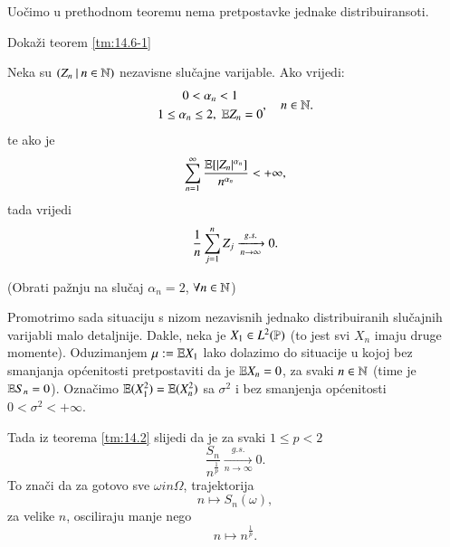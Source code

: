 Uo\v cimo u prethodnom teoremu nema pretpostavke jednake distribuiransoti.

\begin{zad} \label{zad:14.7}
    Doka\v zi teorem \ref{tm:14.6-1}
\end{zad}

\begin{zad} \label{zad:14.8}
    Neka su $({Z_n} \: | \: {n \in \mathbb{N}})$ nezavisne slu\v cajne varijable.
    Ako vrijedi:
    \begin{equation*}
        \begin{gathered}
            \begin{gathered}
                0 < \alpha_n < 1\\
                1 \leq \alpha_n \leq 2, \; \mathbb{E} Z_n = 0
            \end{gathered},
            \quad n \in \mathbb{N}.
        \end{gathered}
    \end{equation*}
    te ako je
    \begin{equation*}
        \sum\limits_{n = 1}^{\infty} \frac{\mathbb{E} [|Z_n|^{\alpha_n}]}{n^{\alpha_n}} < +\infty,
    \end{equation*}
    tada vrijedi
    \begin{equation*}
        \frac{1}{n} \sum\limits_{j = 1}^{n} Z_j \xrightarrow[n \to \infty]{g.s.} 0.
    \end{equation*}
\end{zad}
(Obrati pa\v znju na slu\v caj $\alpha_n = 2$, $\forall n \in \mathbb{N}$)

Promotrimo sada situaciju s nizom nezavisnih jednako distribuiranih slu\v cajnih varijabli malo detaljnije.
Dakle, neka je $X_1 \in L^2 (\mathbb{P})$ (to jest svi $X_n$ imaju druge momente).
Oduzimanjem $\mu := \mathbb{E} X_1$ lako dolazimo do situacije u kojoj bez smanjanja op\' cenitosti pretpostaviti da je $\mathbb{E} X_n = 0$, za svaki $n \in \mathbb{N}$ (time je $\mathbb{E} S_n = 0$).
Ozna\v cimo $\mathbb{E} (X_1^2) = \mathbb{E} (X_n^2)$ sa $\sigma^2$ i bez smanjenja op\' cenitosti $0 < \sigma^2 < +\infty$.

Tada iz teorema \ref{tm:14.2} slijedi da je za svaki $1 \leq p < 2$
\begin{equation}    \label{jed:14.9}
    \frac{S_n}{n^\frac{1}{p}} \xrightarrow[n \to \infty]{g.s.} 0.
\end{equation}
To zna\v ci da za gotovo sve $\omega in \Omega$, trajektorija
\begin{equation*}
    n \mapsto S_n (\omega),
\end{equation*}
za velike $n$, osciliraju manje nego
\begin{equation*}
    n \mapsto n^\frac{1}{p}.
\end{equation*}

